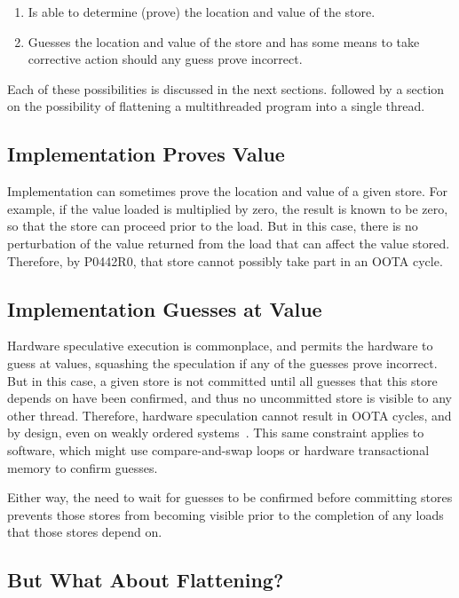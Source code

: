 \documentclass[10]{article}
\begin{document}
\begin{enumerate}
\item	Is able to determine (prove) the location and value of the store.
\item	Guesses the location and value of the store and has some means
	to take corrective action should any guess prove incorrect.
\end{enumerate}

Each of these possibilities is discussed in the next sections.
followed by a section on the possibility of flattening a multithreaded
program into a single thread.

\subsection{Implementation Proves Value}
\label{sec:Implementation Proves Value}

Implementation can sometimes prove the location and value of a given
store.
For example, if the value loaded is multiplied by zero, the result
is known to be zero, so that the store can proceed prior to the load.
But in this case, there is no perturbation of the value returned from
the load that can affect the value stored.
Therefore, by P0442R0, that store cannot possibly take part in an
OOTA cycle.

\subsection{Implementation Guesses at Value}
\label{sec:Implementation Guesses at Value}

Hardware speculative execution is commonplace, and permits the
hardware to guess at values, squashing the speculation if any
of the guesses prove incorrect.
But in this case, a given store is not committed until all guesses that
this store depends on have been confirmed, and thus no uncommitted store
is visible to any other thread.
Therefore, hardware speculation cannot result in OOTA cycles, and
by design, even on weakly ordered
systems~\cite{ARMv7A:2010,ARMv8A:2017,PowerISA2.07-2013}.
This same constraint applies to software, which might use compare-and-swap
loops or hardware transactional memory to confirm guesses.

Either way, the need to wait for guesses to be confirmed before committing
stores prevents those stores from becoming visible prior to the
completion of any loads that those stores depend on.

\subsection{But What About Flattening?}
\label{sec:But What About Flattening?}
\end{document}
